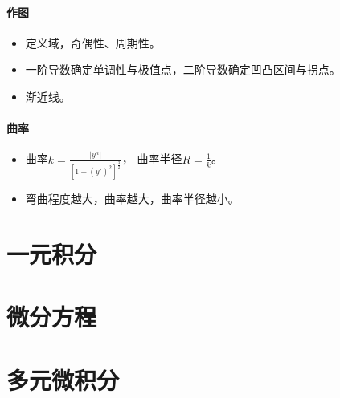 \documentclass[
12pt, %
a4paper, 
oneside, %
headinclude,footinclude, %
]{scrartcl}
\begin{document}
\paragraph{作图}
\begin{itemize}
\item 定义域，奇偶性、周期性。
\item 一阶导数确定单调性与极值点，二阶导数确定凹凸区间与拐点。
\item 渐近线。
\end{itemize}
\paragraph{曲率}
\begin{itemize}
\item 曲率$ k = \frac{|y^n|}{[1 + (y')^2]^{\frac{3}{2}}} $，
曲率半径$ R = \frac{1}{k} $。
\item 弯曲程度越大，曲率越大，曲率半径越小。
\end{itemize}
\section{一元积分}
\subsection{}
\section{微分方程}
\subsection{}
\section{多元微积分}
\subsection{}
\end{document}
